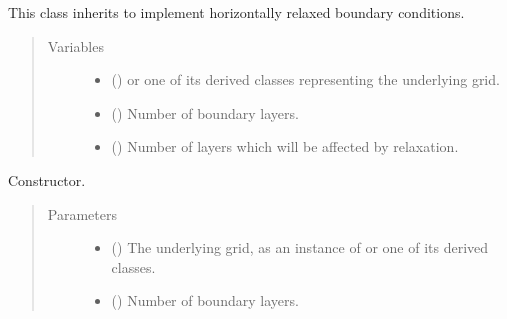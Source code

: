 \documentclass[letterpaper,10pt,english]{sphinxmanual}
\begin{document}
\begin{fulllineitems}
\label{\detokenize{api:dycore.horizontal_boundary_relaxed.Relaxed}}
This class inherits  to implement horizontally
relaxed boundary conditions.
\begin{quote}\begin{description}
\item[{Variables}] \leavevmode\begin{itemize}
\item {} 
 () \textendash{}  or one of its derived classes representing the underlying grid.

\item {} 
{\hyperref[\detokenize{api:dycore.prognostic_isentropic.PrognosticIsentropic.nb}]{}} () \textendash{} Number of boundary layers.

\item {} 
 () \textendash{} Number of layers which will be affected by relaxation.

\end{itemize}

\end{description}\end{quote}

\begin{fulllineitems}
\label{\detokenize{api:dycore.horizontal_boundary_relaxed.Relaxed.__init__}}
Constructor.
\begin{quote}\begin{description}
\item[{Parameters}] \leavevmode\begin{itemize}
\item {} 
 () \textendash{} The underlying grid, as an instance of {\hyperref[\detokenize{api:grids.grid_xyz.GridXYZ}]{}} or one of its derived classes.

\item {} 
 () \textendash{} Number of boundary layers.


\end{itemize}
\end{description}
\end{quote}
\end{fulllineitems}
\end{fulllineitems}
\end{document}
